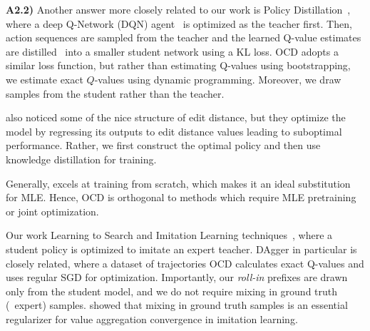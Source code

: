 {\textbf{A2.2)} Another answer more closely related to our work is Policy
Distillation~\citep{rusu-iclr-2016}, where a deep Q-Network (DQN)
agent~\citep{mnihetal15} is optimized as the teacher first. Then, action sequences are sampled from
the teacher and the learned Q-value estimates are distilled~\citep{hinton-nips-2014} into a
smaller student network using a KL loss. OCD adopts a similar loss function,
but rather than estimating Q-values using bootstrapping,
we estimate exact $Q$-values using dynamic programming. Moreover, we draw
samples from the student rather than the teacher.

\cite{bahdanau-iclr-2016} also noticed some of the nice structure of edit distance, but they optimize the model
by regressing its outputs to edit distance values leading to suboptimal performance. Rather, we first construct the optimal policy and then use knowledge distillation for training. 

Generally, \acronym excels at training from scratch, which makes it an ideal substitution for MLE. Hence, OCD is orthogonal to methods which require
MLE pretraining or joint optimization.
}

Our work  Learning to Search \citep{l2s2005} and Imitation Learning
techniques~\citep{ross-aistats-2011,ross2014reinforcement,sun2018truncated},
where a student policy is optimized to imitate an expert teacher.
DAgger \citep{ross-aistats-2011} in particular is closely
related, where a dataset of trajectories  OCD calculates
exact Q-values and uses regular SGD for optimization. Importantly, our {\em roll-in} prefixes are drawn only from the student model,
and we do not require mixing in ground truth (\aka~expert) samples. \cite{cheng2018convergence} showed that
mixing in ground truth samples is an essential regularizer for value aggregation convergence in imitation learning.

